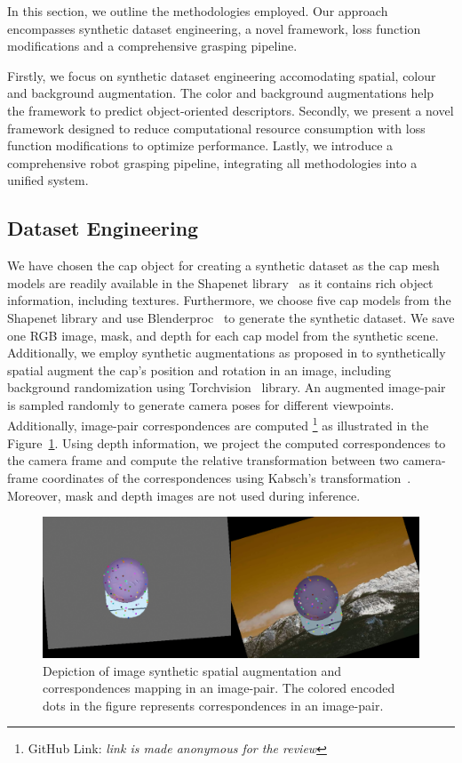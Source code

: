 In this section, we outline the methodologies employed.
Our approach encompasses synthetic dataset engineering,
a novel framework, loss function modifications and a comprehensive grasping pipeline.

Firstly, we focus on synthetic dataset engineering accomodating spatial, colour and background augmentation. The color and
background augmentations help the framework to predict object-oriented descriptors.
Secondly, we present a novel framework designed to reduce computational resource consumption with loss function
modifications to optimize performance. Lastly, we introduce a comprehensive robot grasping pipeline, integrating all methodologies into a unified system.

\subsection{Dataset Engineering}

We have chosen the cap object for creating a synthetic dataset as the cap mesh models are readily available in the Shapenet library~\cite{chang2015shapenet} as it contains rich object information, including textures.
Furthermore, we choose five cap models from the Shapenet library and use Blenderproc~\cite{blenderproc}
to generate the synthetic dataset. We save one RGB image, mask, and depth for each cap model from the synthetic scene.
Additionally, we employ synthetic augmentations as proposed in \cite{adrian2022efficient} to synthetically
spatial augment the cap's position and rotation in an image, including background randomization
using Torchvision~\cite{marcel2010torchvision} library. An augmented image-pair is sampled randomly to generate camera poses for different viewpoints. Additionally, image-pair correspondences are computed
\footnote[1]{GitHub Link: \emph{link is made anonymous for the review}}
as illustrated in the Figure~\ref{fig:image_augs}. Using depth information,
we project the computed correspondences to the camera frame and compute the relative transformation between
two camera-frame coordinates of the correspondences using Kabsch's transformation~\cite{kabsch}.
Moreover, mask and depth images are not used during inference.

\begin{figure}[htb]
    \centering
    \includegraphics[scale=0.175]{images/debug_correspondences.png}
    \caption{Depiction of image synthetic spatial augmentation and correspondences mapping in an image-pair. The colored encoded dots in the figure represents correspondences in an image-pair.}
    \label{fig:image_augs}
\end{figure}

